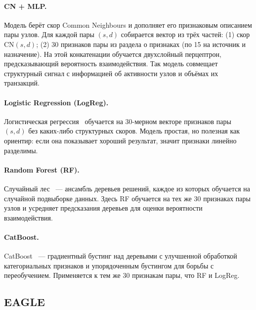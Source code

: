 \documentclass[a4paper,12pt]{extarticle}
\begin{document}
\paragraph{CN + MLP.}
Модель берёт скор Common Neighbours и дополняет его признаковым описанием пары узлов. Для каждой пары $(s, d)$ собирается вектор из трёх частей: (1) скор $\text{CN}(s, d)$; (2) 30 признаков пары из раздела о признаках (по 15 на источник и назначение). На этой конкатенации обучается двухслойный перцептрон, предсказывающий вероятность взаимодействия. Так модель совмещает структурный сигнал с информацией об активности узлов и объёмах их транзакций.

\paragraph{Logistic Regression (LogReg).}
Логистическая регрессия~\cite{bishop2006pattern} обучается на 30-мерном векторе признаков пары $(s, d)$ без каких-либо структурных скоров. Модель простая, но полезная как ориентир: если она показывает хороший результат, значит признаки линейно разделимы.

\paragraph{Random Forest (RF).}
Случайный лес~\cite{breiman2001random} --- ансамбль деревьев решений, каждое из которых обучается на случайной подвыборке данных. Здесь RF обучается на тех же 30 признаках пары узлов и усредняет предсказания деревьев для оценки вероятности взаимодействия.

\paragraph{CatBoost.}
CatBoost~\cite{prokhorenkova2018catboost} --- градиентный бустинг над деревьями с улучшенной обработкой категориальных признаков и упорядоченным бустингом для борьбы с переобучением. Применяется к тем же 30 признакам пары, что RF и LogReg.

\subsection{EAGLE}
\end{document}
